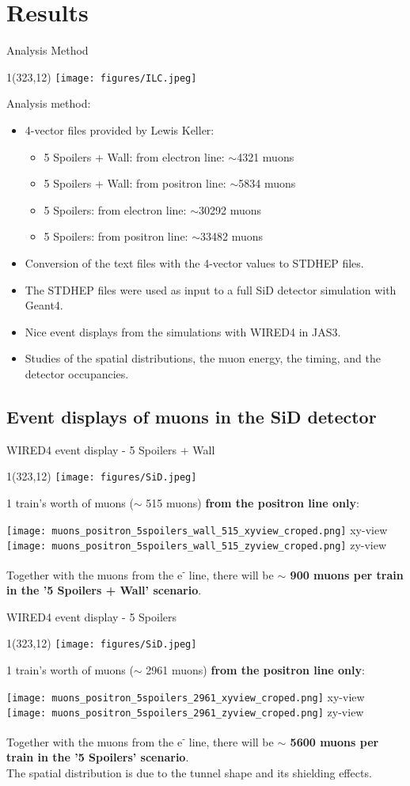 \documentclass[xcolor={dvipsnames}]{beamer}
\newcommand{\sidlogo}{
  \setlength{\TPHorizModule}{1pt}
  \setlength{\TPVertModule}{1pt}
  \begin{textblock}{1}(323,12)
   \texttt{[image: figures/SiD.jpeg]}
  \end{textblock}
  }
\newcommand{\ilclogo}{
  \setlength{\TPHorizModule}{1pt}
  \setlength{\TPVertModule}{1pt}
  \begin{textblock}{1}(323,12)
   \texttt{[image: figures/ILC.jpeg]}
  \end{textblock}
}
\begin{document}
\section{Results}
\begin{frame}{Analysis Method}
\ilclogo
Analysis method:
\begin{itemize}
\item 4-vector files provided by Lewis Keller:
\begin{itemize}
 \item 5 Spoilers + Wall: from electron line: $\sim$4321 muons
 \item 5 Spoilers + Wall: from positron line: $\sim$5834 muons
 \item 5 Spoilers: from electron line: $\sim$30292 muons
 \item 5 Spoilers: from positron line: $\sim$33482 muons
\end{itemize}
\item Conversion of the text files with the 4-vector values to  STDHEP files.
\item The STDHEP files were used as input to a full SiD detector simulation with Geant4.
\item Nice event displays from the simulations with WIRED4 in JAS3.
\item Studies of the spatial distributions, the muon energy, the timing, and the detector occupancies.
\end{itemize}

\end{frame}

\subsection{Event displays of muons in the SiD detector}
\begin{frame}{WIRED4 event display - 5 Spoilers + Wall}
\sidlogo
1 train's worth of muons ($\sim$ 515 muons) \textbf{from the positron line only}:
\begin{center}
\texttt{[image: muons\_positron\_5spoilers\_wall\_515\_xyview\_croped.png]}
{\tiny xy-view}
\texttt{[image: muons\_positron\_5spoilers\_wall\_515\_zyview\_croped.png]}
{\tiny zy-view}
\end{center}
Together with the muons from the e\textsuperscript{-} line, there will be \textbf{$\sim$ 900 muons per train in the '5 Spoilers + Wall' scenario}.
\end{frame}
\begin{frame}{WIRED4 event display - 5 Spoilers}
\sidlogo
1 train's worth of muons ($\sim$ 2961 muons) \textbf{from the positron line only}:
\begin{center}
\texttt{[image: muons\_positron\_5spoilers\_2961\_xyview\_croped.png]}
{\tiny xy-view}
\texttt{[image: muons\_positron\_5spoilers\_2961\_zyview\_croped.png]}
{\tiny zy-view}
\end{center}
Together with the muons from the e\textsuperscript{-} line, there will be \textbf{$\sim$ 5600 muons per train in the '5 Spoilers' scenario}.\\
The spatial distribution is due to the tunnel shape and its shielding effects.
\end{frame}
\end{document}
